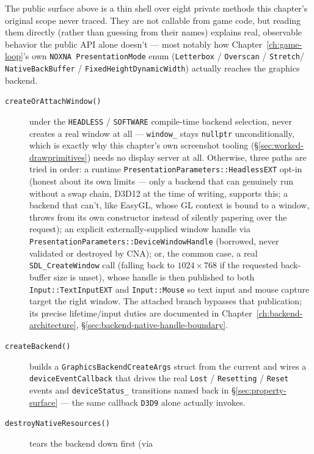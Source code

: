The public surface above is a thin shell over eight private methods this chapter's original
scope never traced. They are not callable from game code, but reading them directly (rather
than guessing from their names) explains real, observable behavior the public API alone
doesn't --- most notably how Chapter~\ref{ch:game-loop}'s own \texttt{NOXNA
PresentationMode} enum (\texttt{Letterbox} / \texttt{Overscan} / \texttt{Stretch}/%
\texttt{NativeBackBuffer} / \texttt{FixedHeightDynamicWidth}) actually reaches the graphics
backend.

\begin{description}
\item[\texttt{createOrAttachWindow()}] under the \texttt{HEADLESS} / \texttt{SOFTWARE}
  compile-time backend selection, never creates a real window at all --- \texttt{window\_}
  stays \texttt{nullptr} unconditionally, which is exactly why this chapter's own screenshot
  tooling (\S\ref{sec:worked-drawprimitives}) needs no display server at all. Otherwise, three
  paths are tried in order: a runtime \texttt{PresentationParameters::HeadlessEXT} opt-in
  (honest about its own limits --- only a backend that can genuinely run without a swap chain,
  D3D12 at the time of writing, supports this; a backend that can't, like EasyGL, whose GL
  context is bound to a window, throws from its own constructor instead of silently
  papering over the request); an explicit externally-supplied window handle via
  \texttt{PresentationParameters::DeviceWindowHandle} (borrowed, never validated or destroyed
  by CNA); or, the common case, a real
  \texttt{SDL\_CreateWindow} call (falling back to $1024\times768$ if the requested back-buffer
  size is unset), whose handle is then published to both \texttt{Input::TextInputEXT} and
  \texttt{Input::Mouse} so text input and mouse capture target the right window. The attached
  branch bypasses that publication; its precise lifetime/input duties are documented in
  Chapter~\ref{ch:backend-architecture}, \S\ref{sec:backend-native-handle-boundary}.
\item[\texttt{createBackend()}] builds a \texttt{GraphicsBackendCreateArgs} struct from the
  current  and wires a \texttt{deviceEventCallback} that
  drives the real \texttt{Lost} / \texttt{Resetting} / \texttt{Reset} events and
  \texttt{deviceStatus\_} transitions named back in \S\ref{sec:property-surface} --- the same
  callback \texttt{D3D9} alone actually invokes.
\item[\texttt{destroyNativeResources()}] tears the backend down first (via

\end{description}
